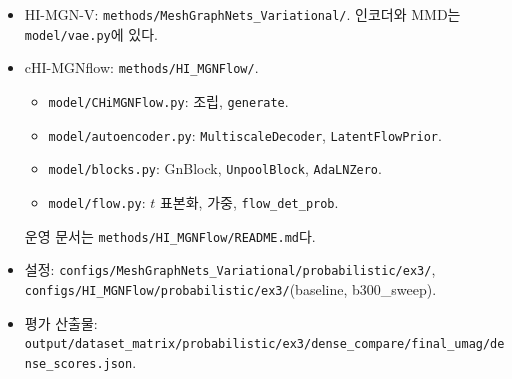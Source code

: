 \documentclass[11pt]{article}
\newcommand{\code}[1]{\texttt{#1}}
\begin{document}
\begin{itemize}
\item HI-MGN-V: \code{methods/MeshGraphNets\_Variational/}. 인코더와 MMD는
  \code{model/vae.py}에 있다.
\item cHI-MGNflow: \code{methods/HI\_MGNFlow/}.
  \begin{itemize}
  \item \code{model/CHiMGNFlow.py}: 조립, \code{generate}.
  \item \code{model/autoencoder.py}: \code{MultiscaleDecoder},
    \code{LatentFlowPrior}.
  \item \code{model/blocks.py}: GnBlock, \code{UnpoolBlock}, \code{AdaLNZero}.
  \item \code{model/flow.py}: $t$ 표본화, 가중, \code{flow\_det\_prob}.
  \end{itemize}
  운영 문서는 \code{methods/HI\_MGNFlow/README.md}다.
\item 설정: \code{configs/MeshGraphNets\_Variational/probabilistic/ex3/},
  \code{configs/HI\_MGNFlow/probabilistic/ex3/}(baseline, b300\_sweep).
\item 평가 산출물:
  \code{output/dataset\_matrix/probabilistic/ex3/dense\_compare/final\_umag/dense\_scores.json}.
\end{itemize}
\end{document}
